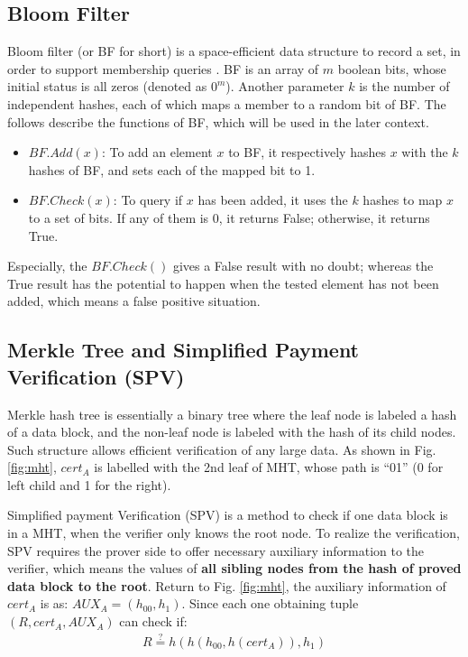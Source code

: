 \documentclass[conference]{IEEEtran}
\begin{document}
\subsection{Bloom Filter}\label{section:bf}
Bloom filter (or BF for short) is a space-efficient data structure to record a set, in order to support membership queries \cite{Bloom1970, broder2004network}.
BF is an array of $m$ boolean bits, whose initial status is all zeros (denoted as $0^m$). Another parameter $k$ is the number of independent hashes, each of which maps a member to a random bit of BF. The follows describe the functions of BF, which will be used in the later context.

\begin{itemize}
    \item $BF.Add(x)$: To add an element $x$ to BF, it respectively hashes $x$ with the $k$ hashes of BF, and sets each of the mapped bit to 1.
	\item $BF.Check(x)$: To query if $x$ has been added, it uses the $k$ hashes to map $x$ to a set of bits. If any of them is 0, it returns False; otherwise, it returns True. 
\end{itemize}

Especially, the $BF.Check()$ gives a False result with no doubt; whereas the True result has the potential to happen when the tested element has not been added, which means a false positive situation. 

\subsection{Merkle Tree and Simplified Payment Verification (SPV)}
\label{section:merkle}
Merkle hash tree \cite{merkle1987digital} is essentially a binary tree where the leaf node is labeled a hash of a data block, and the non-leaf node is labeled with the hash of its child nodes. Such structure allows efficient verification of any large data. As shown in Fig. \ref{fig:mht}, $cert_A$ is labelled with the 2nd leaf of MHT, whose path is ``01'' (0 for left child and 1 for the right).

Simplified payment Verification (SPV) is a method to check if one data block is in a MHT, when the verifier only knows the root node. To realize the verification, SPV requires the prover side to offer necessary auxiliary information to the verifier, which means the values of \textbf{all sibling nodes from the hash of proved data block to the root}.
Return to Fig. \ref{fig:mht}, the auxiliary information of $cert_A$ is as: $AUX_A = (h_{00}, h_{1})$. Since each one obtaining tuple $(R, cert_A, AUX_A)$ can check if:
\begin{align}\label{eq:aux}
R \overset{?}{=} h(h(h_{00}, h(cert_A)), h_1)
\end{align}
\end{document}
